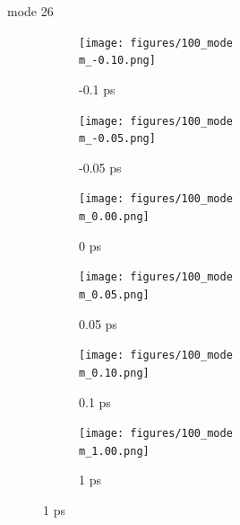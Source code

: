 \documentclass{beamer}
\newcommand\w{0.32}
\begin{document}
\renewcommand\m{26}
\begin{frame}{mode \m}
	\begin{figure}
		\centering
		\begin{subfigure}[b]{\w\textwidth}
			\centering
			\texttt{[image: figures/100\_mode\\m\_-0.10.png]}
			\caption{-0.1 ps}
		\end{subfigure}
		\begin{subfigure}[b]{\w\textwidth}
			\centering
			\texttt{[image: figures/100\_mode\\m\_-0.05.png]}
			\caption{-0.05 ps}
		\end{subfigure}
		\begin{subfigure}[b]{\w\textwidth}
			\centering
			\texttt{[image: figures/100\_mode\\m\_0.00.png]}
			\caption{0 ps}
		\end{subfigure}
		\begin{subfigure}[b]{\w\textwidth}
			\centering
			\texttt{[image: figures/100\_mode\\m\_0.05.png]}
			\caption{0.05 ps}
		\end{subfigure}
		\begin{subfigure}[b]{\w\textwidth}
			\centering
			\texttt{[image: figures/100\_mode\\m\_0.10.png]}
			\caption{0.1 ps}
		\end{subfigure}
		\begin{subfigure}[b]{\w\textwidth}
			\centering
			\texttt{[image: figures/100\_mode\\m\_1.00.png]}
			\caption{1 ps}
		\end{subfigure}
	\end{figure}
\end{frame}
\end{document}
